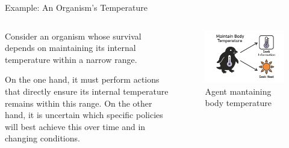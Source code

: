 \documentclass[aspectratio=1610, english]{beamer}
\begin{document}
\begin{frame}{Example: An Organism's Temperature}
    \begin{columns}[T]
        \begin{column}{0.5\textwidth}
            Consider an organism whose survival depends on maintaining its internal temperature within a narrow range.

            \vspace{0.3cm}
        
            On the one hand, it must perform actions that directly ensure its internal temperature remains within this range.  
            On the other hand, it is uncertain which specific policies will best achieve this over time and in changing conditions.
        \end{column}
        \begin{column}{0.5\textwidth}
            \begin{figure}
                \centering
                \includegraphics[width=1.0\linewidth]{img/active_inference_agent.png}
                \caption{Agent mantaining body temperature}
                \label{fig:active-inference-agent}
            \end{figure}
        \end{column}
    \end{columns}
\end{frame}
\end{document}
